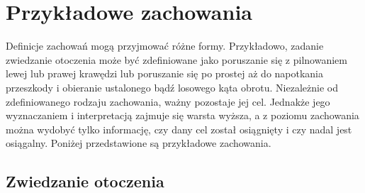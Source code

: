 
\section{Przykładowe zachowania}

Definicje zachowań mogą przyjmować różne formy. Przykładowo, zadanie zwiedzanie otoczenia może być zdefiniowane jako poruszanie się z pilnowaniem lewej lub prawej krawędzi lub poruszanie się po prostej aż do napotkania przeszkody i obieranie ustalonego bądź losowego kąta obrotu. Niezależnie od zdefiniowanego rodzaju zachowania, ważny pozostaje jej cel. Jednakże jego wyznaczaniem i interpretacją zajmuje się warsta wyższa, a z poziomu zachowania można wydobyć tylko informację, czy dany cel został osiągnięty i czy nadal jest osiągalny. Poniżej przedstawione są przykładowe zachowania.

\subsection{Zwiedzanie otoczenia}

